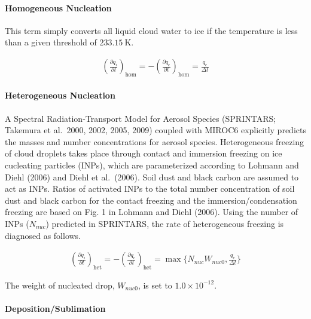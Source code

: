 \hypertarget{homogeneous-nucleation}{%
\paragraph{Homogeneous Nucleation}\label{homogeneous-nucleation}}

This term simply converts all liquid cloud water to ice if the
temperature is less than a given threshold of \(233.15 \mathrm{~K}\).

\begin{eqnarray}
\left(\frac{\partial q_i}{\partial t}\right)_{\text {hom}}
=-\left(\frac{\partial q_c}{\partial t}\right)_{\text {hom}}
=  \frac{q_c}{\Delta t}
\end{eqnarray}

\hypertarget{heterogeneous-nucleation}{%
\paragraph{Heterogeneous Nucleation}\label{heterogeneous-nucleation}}

A Spectral Radiation-Transport Model for Aerosol Species (SPRINTARS;
Takemura et al.~2000, 2002, 2005, 2009) coupled with MIROC6 explicitly
predicts the masses and number concentrations for aerosol species.
Heterogeneous freezing of cloud droplets takes place through contact and
immersion freezing on ice cucleating particles (INPs), which are
parameterized according to Lohmann and Diehl (2006) and Diehl et
al.~(2006). Soil dust and black carbon are assumed to act as INPs.
Ratios of activated INPs to the total number concentration of soil dust
and black carbon for the contact freezing and the immersion/condensation
freezing are based on Fig. 1 in Lohmann and Diehl (2006). Using the
number of INPs (\(N_{nuc}\)) predicted in SPRINTARS, the rate of
heterogeneous freezing is diagnosed as follows.

\begin{eqnarray}
\left(\frac{\partial q_i}{\partial t}\right)_{\text {het}}
=-\left(\frac{\partial q_c}{\partial t}\right)_{\text {het}}
=  \max \{N_{nuc} W_{nuc0}, \frac{q_c}{\Delta t}\}
\end{eqnarray}

The weight of nucleated drop, \(W_{nuc0}\), is set to
\(1.0\times10^{-12}\).

\hypertarget{depositionsublimation}{%
\paragraph{Deposition/Sublimation}\label{depositionsublimation}}

